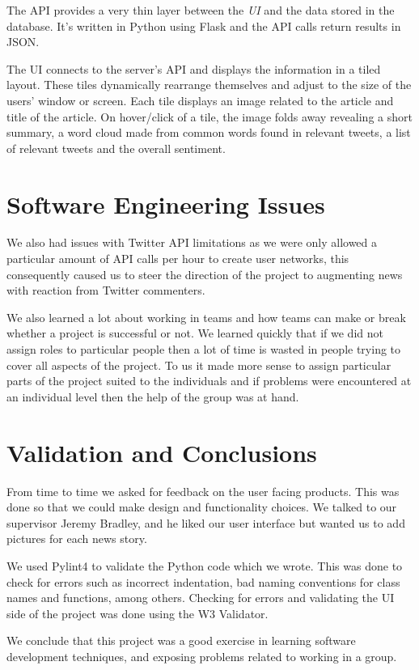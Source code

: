 \documentclass[a4paper,12pt]{article}
\begin{document}
	 The API provides a very thin layer between the \emph{UI} and the data stored in the database. It's written in Python using Flask and the API calls return results in JSON.
	 
	 The UI connects to the server's API and displays the information in a tiled layout. These tiles dynamically rearrange themselves and adjust to the size of the users' window or screen. Each tile displays an image related to the article and title of the article. On hover/click of a tile, the image folds away revealing a short summary, a word cloud made from common words found in relevant tweets, a list of relevant tweets and the overall sentiment.
  
  \section{Software Engineering Issues}
  
  We also had issues with Twitter API limitations as we were only allowed a particular amount of API calls per hour to create user networks, this consequently caused us to steer the direction of the project to augmenting news with reaction from Twitter commenters.
  
  We also learned a lot about working in teams and how teams can make or break whether a project is successful or not. We learned quickly that if we did not assign roles to particular people then a lot of time is wasted in people trying to cover all aspects of the project. To us it made more sense to assign particular parts of the project suited to the individuals and if problems were encountered at an individual level then the help of the group was at hand.
  
  \section{Validation and Conclusions}
  
	From time to time we asked for feedback on the user facing products. This was done so that we could make design and functionality choices. We talked to our supervisor Jeremy Bradley, and he liked our user interface but wanted us to add pictures for each news story.
	
	We used Pylint4 to validate the Python code which we wrote. This was done to check for errors such as incorrect indentation, bad naming conventions for class names and functions, among others. Checking for errors and validating the UI side of the project was done using the W3 Validator.
	
	We conclude that this project was a good exercise in learning software development techniques, and exposing problems related to working in a group.
  
\end{document}
